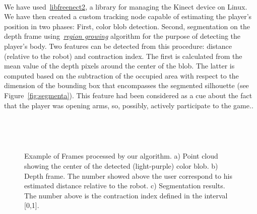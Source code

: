 We have used~\href{https://github.com/OpenKinect/libfreenect2}{libfreenect2}, a library for managing the Kinect\textsuperscript{\textregistered} device on Linux. We have then created a custom tracking node capable of estimating the player's position in two phases: First, color blob detection. Second, segmentation on the depth frame using~\href{https://en.wikipedia.org/wiki/Region_growing}{\textit{region growing}} algorithm for the purpose of detecting the player's body. Two features can be detected from this procedure: distance (relative to the robot) and contraction index. The first is calculated from the mean value of the depth pixels around the center of the blob. The latter is computed based on the subtraction of the occupied area with respect to the dimension of the bounding box that encompasses the segmented silhouette (see Figure~\ref{fig:segmenta}). This feature had been considered as a cue about the fact that the player was opening arms, so, possibly, actively participate to the game..

\begin{figure}[H]
  \centering 
  \begin{subfigure}[b]{0.3\textwidth}
		\centering
		\caption{}
  \end{subfigure}
  ~
  \begin{subfigure}[b]{0.3\textwidth}
		\centering
		\caption{}
  \end{subfigure}
  ~
  \begin{subfigure}[b]{0.3\textwidth}
		\centering
		\caption{}
  \end{subfigure}
  \caption{Example of Frames processed by our algorithm. a) Point cloud showing the center of the detected (light-purple) color blob. b) Depth frame. The number showed above the user correspond to his estimated distance relative to the robot. c) Segmentation results. The number above is the contraction index defined in the interval [0,1].}\label{fig:segmenta}
   \label{segmentacao}
\end{figure}

